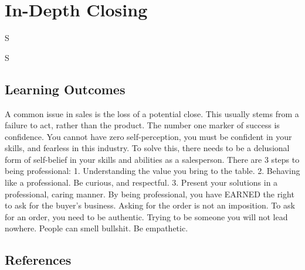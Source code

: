 \frenchspacing
\chapter{In-Depth Closing}
\epigraph{S}{S}

%
\section{Learning Outcomes}

A common issue in sales is the loss of a potential close. This usually stems from a failure to act, rather than the product. The number one marker of success is confidence. You cannot have zero self-perception, you must be confident in your skills, and fearless in this industry.
To solve this, there needs to be a delusional form of self-belief in your skills and abilities as a salesperson.
There are 3 steps to being professional:
1.	Understanding the value you bring to the table. 
2.	Behaving like a professional. Be curious, and respectful. 
3.	Present your solutions in a professional, caring manner.
By being professional, you have EARNED the right to ask for the buyer’s business. Asking for the order is not an imposition. 
To ask for an order, you need to be authentic. Trying to be someone you will not lead nowhere. People can smell bullshit. Be empathetic. 


%
\section{References}